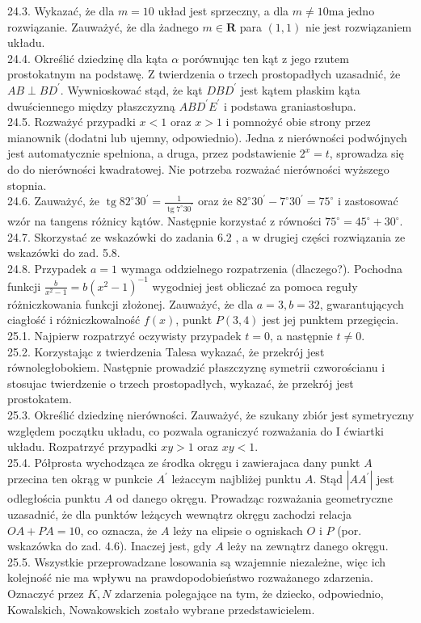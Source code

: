 \documentclass[10pt]{article}
\begin{document}
24.3. Wykazać, że dla $m=10$ układ jest sprzeczny, a dla $m \neq 10 \mathrm{ma}$ jedno rozwiązanie. Zauważyć, że dla żadnego $m \in \mathbf{R}$ para $(1,1)$ nie jest rozwiązaniem układu.\\
24.4. Określić dziedzinę dla kąta $\alpha$ porównując ten kąt z jego rzutem prostokatnym na podstawę. Z twierdzenia o trzech prostopadłych uzasadnić, że $A B \perp B D^{\prime}$. Wywnioskować stąd, że kąt $D B D^{\prime}$ jest kątem płaskim kąta dwuściennego między płaszczyzną $A B D^{\prime} E^{\prime}$ i podstawa graniastosłupa.\\
24.5. Rozważyć przypadki $x<1$ oraz $x>1$ i pomnożyć obie strony przez mianownik (dodatni lub ujemny, odpowiednio). Jedna z nierówności podwójnych jest automatycznie spełniona, a druga, przez podstawienie $2^{x}=t$, sprowadza się do do nierówności kwadratowej. Nie potrzeba rozważać nierówności wyższego stopnia.\\
24.6. Zauważyć, że $\operatorname{tg} 82^{\circ} 30^{\prime}=\frac{1}{\operatorname{tg} 7^{\circ} 30^{\prime}}$ oraz że $82^{\circ} 30^{\prime}-7^{\circ} 30^{\prime}=75^{\circ}$ i zastosować wzór na tangens różnicy kątów. Następnie korzystać z równości $75^{\circ}=45^{\circ}+30^{\circ}$.\\
24.7. Skorzystać ze wskazówki do zadania 6.2 , a w drugiej części rozwiązania ze wskazówki do zad. 5.8.\\
24.8. Przypadek $a=1$ wymaga oddzielnego rozpatrzenia (dlaczego?). Pochodna funkcji $\frac{b}{x^{2}-1}=b\left(x^{2}-1\right)^{-1}$ wygodniej jest obliczać za pomoca reguły różniczkowania funkcji złożonej. Zauważyć, że dla $a=3, b=32$, gwarantujących ciagłość i różniczkowalność $f(x)$, punkt $P(3,4)$ jest jej punktem przegięcia.\\
25.1. Najpierw rozpatrzyć oczywisty przypadek $t=0$, a następnie $t \neq 0$.\\
25.2. Korzystając z twierdzenia Talesa wykazać, że przekrój jest równoległobokiem. Następnie prowadzić płaszczyznę symetrii czworościanu i stosujac twierdzenie o trzech prostopadłych, wykazać, że przekrój jest prostokatem.\\
25.3. Określić dziedzinę nierówności. Zauważyć, że szukany zbiór jest symetryczny względem początku układu, co pozwala ograniczyć rozważania do I ćwiartki układu. Rozpatrzyć przypadki $x y>1$ oraz $x y<1$.\\
25.4. Półprosta wychodząca ze środka okręgu i zawierajaca dany punkt $A$ przecina ten okrąg w punkcie $A^{\prime}$ leżaccym najbliżej punktu $A$. Stąd $\left|A A^{\prime}\right|$ jest odległościa punktu $A$ od danego okręgu. Prowadząc rozważania geometryczne uzasadnić, że dla punktów leżących wewnątrz okręgu zachodzi relacja $O A+P A=10$, co oznacza, że $A$ leży na elipsie o ogniskach $O$ i $P$ (por. wskazówka do zad. 4.6). Inaczej jest, gdy $A$ leży na zewnątrz danego okręgu.\\
25.5. Wszystkie przeprowadzane losowania są wzajemnie niezależne, więc ich kolejność nie ma wpływu na prawdopodobieństwo rozważanego zdarzenia. Oznaczyć przez $K, N$ zdarzenia polegające na tym, że dziecko, odpowiednio, Kowalskich, Nowakowskich zostało wybrane przedstawicielem.
\end{document}
